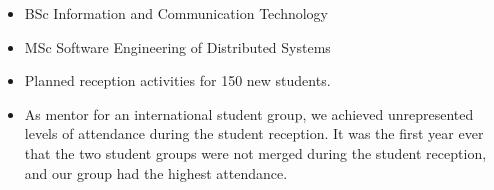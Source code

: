 \documentclass[10pt,a4paper]{altacv}
\begin{document}
\begin{itemize}
    \item BSc Information and Communication Technology
    \item MSc Software Engineering of Distributed Systems
\end{itemize}

\divider



\begin{itemize}
    \item Planned reception activities for 150 new students.
    \item As mentor for an international student group, we achieved unrepresented levels of attendance during the student reception. It was the first year ever that the two student groups were not merged during the student reception, and our group had the highest attendance.
\end{itemize}

\divider



\end{document}
